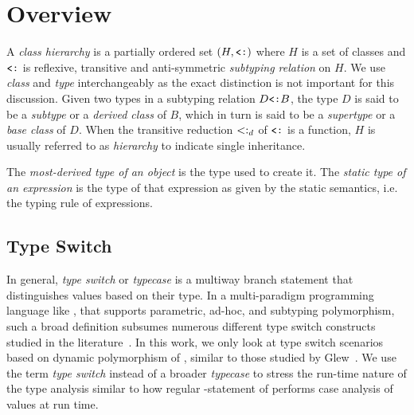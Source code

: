 \section{Overview} %
\label{sec:over}

A \emph{class hierarchy} is a partially ordered set $(H,\subtype)$ where $H$ is a set 
of classes and $\subtype$ is reflexive, transitive and anti-symmetric 
\emph{subtyping relation} on $H$. We use \emph{class} and \emph{type}  
interchangeably as the exact distinction is not important for this discussion. 
Given two types in a subtyping relation $D \subtype B$, the type $D$ is said to be a 
\emph{subtype} or a \emph{derived class} of $B$, which in turn is said to be a 
\emph{supertype} or a \emph{base class} of $D$. When the transitive reduction 
$<:_d$ of $\subtype$ is a function, $H$ is usually referred to as 
\emph{hierarchy} to indicate single inheritance.

The \emph{most-derived type of an object} is the type used to create it.
The \emph{static type of an expression} is the type of that expression
as given by the static semantics, i.e. the typing rule of expressions.

\subsection{Type Switch}

In general, \emph{type switch} or \emph{typecase} is a multiway branch statement 
that distinguishes values based on their type. In a multi-paradigm programming 
language like \Cpp{}, that supports parametric, ad-hoc, and 
subtyping polymorphism, such a broad definition subsumes numerous different
type switch constructs studied in the literature~\cite{Intensional95,Glew99,OpenShutTypecase05}. 
In this work, we only look at type switch scenarios based on dynamic polymorphism 
of \Cpp{}, similar to 
those studied by Glew~\cite{Glew99}. 
We use the term \emph{type switch} instead of a broader \emph{typecase} to 
stress the run-time nature of the type analysis similar to how regular 
-statement of \Cpp{} performs case analysis of values at run time.

